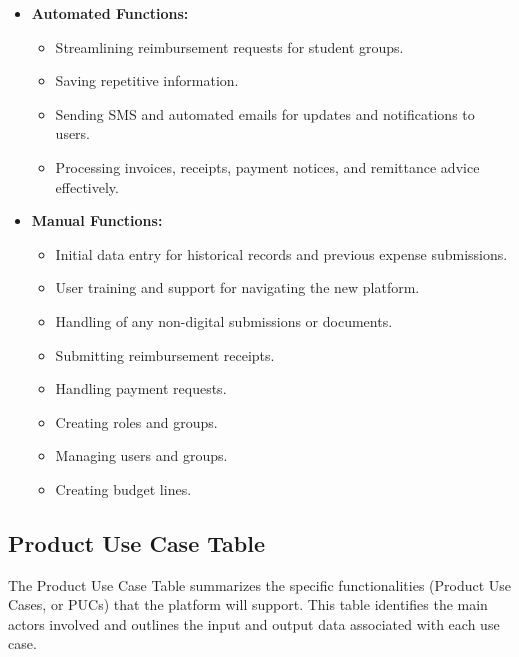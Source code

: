 \documentclass[12pt]{article}
\begin{document}
\begin{itemize}
    \item \textbf{Automated Functions:}
    \begin{itemize}
        \item Streamlining reimbursement requests for student groups.
        \item Saving repetitive information.
        \item Sending SMS and automated emails for updates and notifications to users.
        \item Processing invoices, receipts, payment notices, and remittance advice effectively.
    \end{itemize}
    \item \textbf{Manual Functions:}
    \begin{itemize}
        \item Initial data entry for historical records and previous expense submissions.
        \item User training and support for navigating the new platform.
        \item Handling of any non-digital submissions or documents.
        \item Submitting reimbursement receipts.
        \item Handling payment requests. 
        \item Creating roles and groups. 
        \item Managing users and groups. 
        \item Creating budget lines. 
    \end{itemize}
\end{itemize}

\subsection{Product Use Case Table}
The Product Use Case Table summarizes the specific functionalities (Product Use Cases, or PUCs) that the platform will support. This table identifies the main actors involved and outlines the input and output data associated with each use case.
\end{document}
